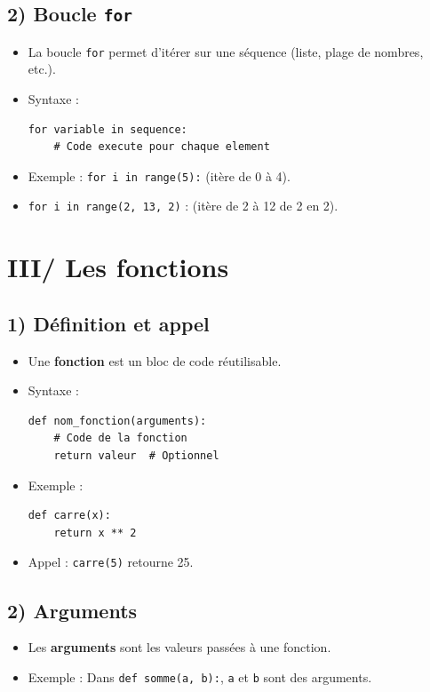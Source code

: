 \documentclass[11pt,a4paper]{article}
\begin{document}
\subsection*{2) Boucle \texttt{for}}
\begin{itemize}[leftmargin=*]
    \item La boucle \texttt{for} permet d'itérer sur une séquence (liste, plage de nombres, etc.).
    \item Syntaxe :
    \begin{lstlisting}
for variable in sequence:
    # Code execute pour chaque element
    \end{lstlisting}
    \item Exemple : \lstinline|for i in range(5):| (itère de 0 à 4).
    \item \lstinline|for i in range(2, 13, 2)| : (itère de 2 à 12 de 2 en 2).
\end{itemize}


\section*{III/ Les fonctions}
\subsection*{1) Définition et appel}
\begin{itemize}[leftmargin=*]
    \item Une \textbf{fonction} est un bloc de code réutilisable.
    \item Syntaxe :
    \begin{lstlisting}
def nom_fonction(arguments):
    # Code de la fonction
    return valeur  # Optionnel
    \end{lstlisting}
    \item Exemple :
    \begin{lstlisting}
def carre(x):
    return x ** 2
    \end{lstlisting}
    \item Appel : \lstinline|carre(5)| retourne 25.
\end{itemize}

\subsection*{2) Arguments}
\begin{itemize}[leftmargin=*]
    \item Les \textbf{arguments} sont les valeurs passées à une fonction.
    \item Exemple : Dans \lstinline|def somme(a, b):|, \lstinline|a| et \lstinline|b| sont des arguments.
\end{itemize}
\end{document}
